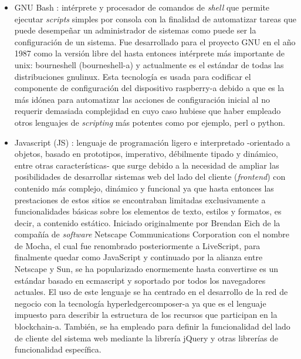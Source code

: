 \documentclass[12pt,a4paper, twoside]{report}
\begin{document}
	\begin{itemize}
		\item GNU Bash \cite{bash}: intérprete y procesador de comandos de \textit{\gls{shell}} que permite ejecutar \textit{\glspl{script}} simples por consola con la finalidad de automatizar tareas que puede desempeñar un administrador de sistemas como puede ser la configuración de un sistema. Fue desarrollado para el proyecto GNU en el año 1987 como la versión libre del hasta entonces intérprete más importante de \gls{unix}: \gls{bourneshell} (\gls{bourneshell-a}) y actualmente es el estándar de todas las distribuciones \gls{gnulinux}. Esta tecnología es usada para codificar el componente de configuración del dispositivo \gls{raspberry-a} debido a que es la más idónea para automatizar las acciones de configuración inicial al no requerir demasiada complejidad en cuyo caso hubiese que haber empleado otros lenguajes de \textit{scripting} más potentes como por ejemplo, \gls{perl} o \gls{python}.
		 	
		\item Javascript (JS) \cite{javascript}: lenguaje de programación ligero e interpretado -orientado a objetos, basado en prototipos, imperativo, débilmente tipado y dinámico, entre otras características- que surge debido a la necesidad de ampliar las posibilidades de desarrollar sistemas web del lado del cliente (\textit{\gls{frontend}}) con contenido más complejo, dinámico y funcional ya que hasta entonces las prestaciones de estos sitios se encontraban limitadas exclusivamente a funcionalidades básicas sobre los elementos de texto, estilos y formatos, es decir, a contenido estático. Iniciado originalmente por Brendan Eich de la compañía de \textit{software} Netscape Communications Corporation con el nombre de Mocha, el cual fue renombrado posteriormente a LiveScript, para finalmente quedar como JavaScript y continuado por la alianza entre Netscape y Sun, se ha popularizado enormemente hasta convertirse es un estándar basado en \gls{ecmascript} y soportado por todos los navegadores actuales. El uso de este lenguaje se ha centrado en el desarrollo de la red de negocio con la tecnología \gls{hyperledgercomposer-a} ya que es el lenguaje impuesto para describir la estructura de los recursos que participan en la \gls{blockchain-a}. También, se ha empleado para definir la funcionalidad del lado de cliente del sistema web mediante la librería jQuery y otras librerías de funcionalidad específica.
		

\end{itemize}
\end{document}
